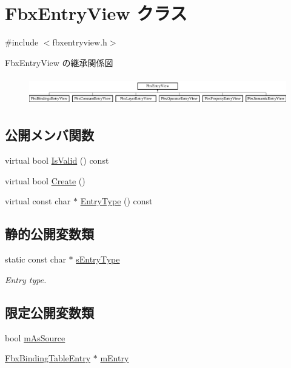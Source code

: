 \hypertarget{class_fbx_entry_view}{}\section{Fbx\+Entry\+View クラス}
\label{class_fbx_entry_view}


{\ttfamily \#include $<$fbxentryview.\+h$>$}

Fbx\+Entry\+View の継承関係図\begin{figure}[H]
\begin{center}
\leavevmode
\includegraphics[height=1.244444cm]{class_fbx_entry_view}
\end{center}
\end{figure}
\subsection*{公開メンバ関数}
\begin{DoxyCompactItemize}
\item 
virtual bool \hyperlink{class_fbx_entry_view_a6bbdad937ef02ffbacd343fd71ed85d7}{Is\+Valid} () const
\item 
virtual bool \hyperlink{class_fbx_entry_view_aeff9d8adb34fe45d338c65483b52d2fc}{Create} ()
\item 
virtual const char $\ast$ \hyperlink{class_fbx_entry_view_a83ee50482b441ba8b0e6d7c2dba5432f}{Entry\+Type} () const
\end{DoxyCompactItemize}
\subsection*{静的公開変数類}
\begin{DoxyCompactItemize}
\item 
static const char $\ast$ \hyperlink{class_fbx_entry_view_a483b58dc47c39143426afe0d2076b6f6}{s\+Entry\+Type}
\begin{DoxyCompactList}\small\item\em Entry type. \end{DoxyCompactList}\end{DoxyCompactItemize}
\subsection*{限定公開変数類}
\begin{DoxyCompactItemize}
\item 
bool \hyperlink{class_fbx_entry_view_a274da88dfb87f2725f9c8fdbfe860c75}{m\+As\+Source}
\item 
\hyperlink{class_fbx_binding_table_entry}{Fbx\+Binding\+Table\+Entry} $\ast$ \hyperlink{class_fbx_entry_view_a74afe18ad35e48e7bd6dce480ab49ad7}{m\+Entry}
\end{DoxyCompactItemize}
